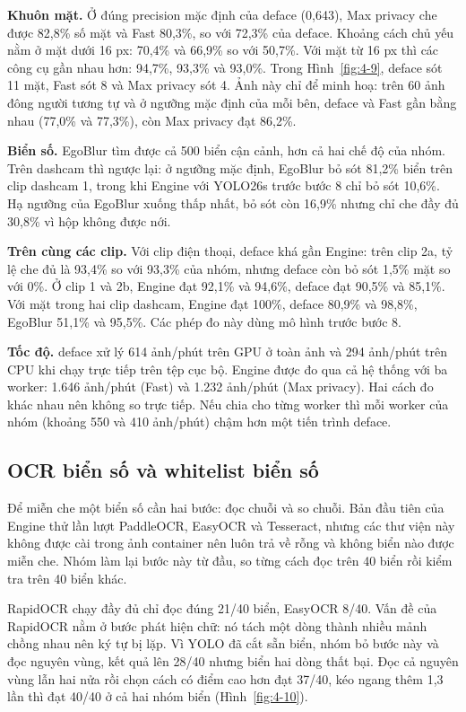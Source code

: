 \textbf{Khuôn mặt.} Ở đúng precision mặc định của deface (0,643), Max privacy che được 82,8\% số mặt và Fast 80,3\%, so với 72,3\% của deface. Khoảng cách chủ yếu nằm ở mặt dưới 16 px: 70,4\% và 66,9\% so với 50,7\%. Với mặt từ 16 px thì các công cụ gần nhau hơn: 94,7\%, 93,3\% và 93,0\%. Trong Hình~\ref{fig:4-9}, deface sót 11 mặt, Fast sót 8 và Max privacy sót 4. Ảnh này chỉ để minh hoạ: trên 60 ảnh đông người tương tự và ở ngưỡng mặc định của mỗi bên, deface và Fast gần bằng nhau (77,0\% và 77,3\%), còn Max privacy đạt 86,2\%.

\textbf{Biển số.} EgoBlur tìm được cả 500 biển cận cảnh, hơn cả hai chế độ của nhóm. Trên dashcam thì ngược lại: ở ngưỡng mặc định, EgoBlur bỏ sót 81,2\% biển trên clip dashcam 1, trong khi Engine với YOLO26s trước bước 8 chỉ bỏ sót 10,6\%. Hạ ngưỡng của EgoBlur xuống thấp nhất, bỏ sót còn 16,9\% nhưng chỉ che đầy đủ 30,8\% vì hộp không được nới.

\textbf{Trên cùng các clip.} Với clip điện thoại, deface khá gần Engine: trên clip 2a, tỷ lệ che đủ là 93,4\% so với 93,3\% của nhóm, nhưng deface còn bỏ sót 1,5\% mặt so với 0\%. Ở clip 1 và 2b, Engine đạt 92,1\% và 94,6\%, deface đạt 90,5\% và 85,1\%. Với mặt trong hai clip dashcam, Engine đạt 100\%, deface 80,9\% và 98,8\%, EgoBlur 51,1\% và 95,5\%. Các phép đo này dùng mô hình trước bước 8.

\textbf{Tốc độ.} deface xử lý 614 ảnh/phút trên GPU ở toàn ảnh và 294 ảnh/phút trên CPU khi chạy trực tiếp trên tệp cục bộ. Engine được đo qua cả hệ thống với ba worker: 1.646 ảnh/phút (Fast) và 1.232 ảnh/phút (Max privacy). Hai cách đo khác nhau nên không so trực tiếp. Nếu chia cho từng worker thì mỗi worker của nhóm (khoảng 550 và 410 ảnh/phút) chậm hơn một tiến trình deface.

\subsection{OCR biển số và whitelist biển số}

Để miễn che một biển số cần hai bước: đọc chuỗi và so chuỗi. Bản đầu tiên của Engine thử lần lượt PaddleOCR, EasyOCR và Tesseract, nhưng các thư viện này không được cài trong ảnh container nên luôn trả về rỗng và không biển nào được miễn che. Nhóm làm lại bước này từ đầu, so từng cách đọc trên 40 biển rồi kiểm tra trên 40 biển khác.

RapidOCR chạy đầy đủ chỉ đọc đúng 21/40 biển, EasyOCR 8/40. Vấn đề của RapidOCR nằm ở bước phát hiện chữ: nó tách một dòng thành nhiều mảnh chồng nhau nên ký tự bị lặp. Vì YOLO đã cắt sẵn biển, nhóm bỏ bước này và đọc nguyên vùng, kết quả lên 28/40 nhưng biển hai dòng thất bại. Đọc cả nguyên vùng lẫn hai nửa rồi chọn cách có điểm cao hơn đạt 37/40, kéo ngang thêm 1,3 lần thì đạt 40/40 ở cả hai nhóm biển (Hình~\ref{fig:4-10}).

